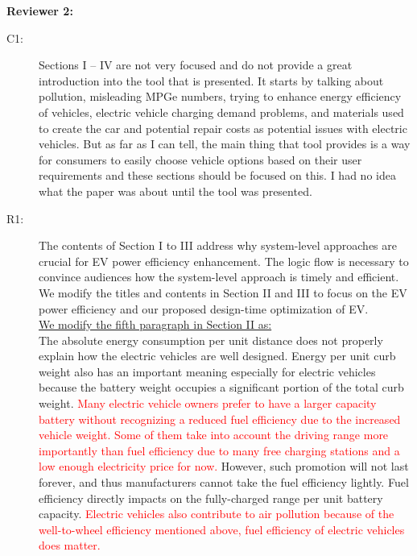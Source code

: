 \documentclass[onecolumn]{IEEEconf}
\begin{document}
\textbf{Reviewer 2:}
\begin{description}
\item [C1: ] Sections I -- IV are not very focused and do not provide a great introduction into the tool that is presented. It starts by talking about pollution, misleading MPGe numbers, trying to enhance energy efficiency of vehicles, electric vehicle charging demand problems, and materials used to create the car and potential repair costs as potential issues with electric vehicles. But as far as I can tell, the main thing that tool provides is a way for consumers to easily choose vehicle options based on their user requirements and these sections should be focused on this. I had no idea what the paper was about until the tool was presented.
\item [R1: ] The contents of Section I to III address why system-level approaches are crucial for EV power efficiency enhancement. The logic flow is necessary to convince audiences how the system-level approach is timely and efficient. We modify the titles and contents in Section II and III to focus on the EV power efficiency and our proposed design-time optimization of EV.\\

\underline{We modify the fifth paragraph in Section II as:}\\
The absolute energy consumption per unit distance does not properly explain how the electric vehicles are well designed. 
Energy per unit curb weight also has an important meaning especially for electric vehicles because the battery weight occupies a significant portion of the total curb weight. 
\textcolor{red}{Many electric vehicle owners prefer to have a larger capacity battery without recognizing a reduced fuel efficiency due to the increased vehicle weight. Some of them take into account the driving range more importantly than fuel efficiency due to many free charging stations and a low enough electricity price for now.}
However, such promotion will not last forever, and thus manufacturers cannot take the fuel efficiency lightly. Fuel efficiency directly impacts on the fully-charged range per unit battery capacity. 
\textcolor{red}{Electric vehicles also contribute to air pollution because of the well-to-wheel efficiency mentioned above, fuel efficiency of electric vehicles does matter.}
~\\


\end{description}
\end{document}
